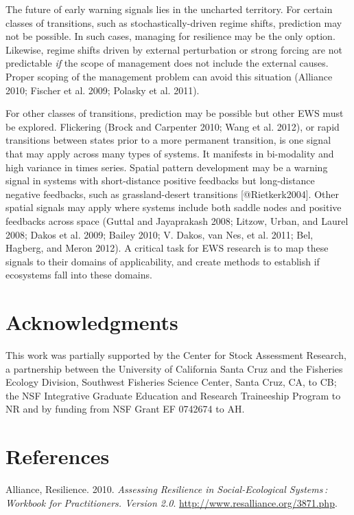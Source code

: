 \documentclass[author-year, review]{elsarticle} %
\begin{document}
The future of early warning signals lies in the uncharted territory. For
certain classes of transitions, such as stochastically-driven regime
shifts, prediction may not be possible. In such cases, managing for
resilience may be the only option. Likewise, regime shifts driven by
external perturbation or strong forcing are not predictable \emph{if}
the scope of management does not include the external causes. Proper
scoping of the management problem can avoid this situation (Alliance
2010; Fischer et al. 2009; Polasky et al. 2011).

For other classes of transitions, prediction may be possible but other
EWS must be explored. Flickering (Brock and Carpenter 2010; Wang et al.
2012), or rapid transitions between states prior to a more permanent
transition, is one signal that may apply across many types of systems.
It manifests in bi-modality and high variance in times series. Spatial
pattern development may be a warning signal in systems with
short-distance positive feedbacks but long-distance negative feedbacks,
such as grassland-desert transitions {[}@Rietkerk2004{]}. Other spatial
signals may apply where systems include both saddle nodes and positive
feedbacks across space (Guttal and Jayaprakash 2008; Litzow, Urban, and
Laurel 2008; Dakos et al. 2009; Bailey 2010; V. Dakos, van Nes, et al.
2011; Bel, Hagberg, and Meron 2012). A critical task for EWS research is
to map these signals to their domains of applicability, and create
methods to establish if ecosystems fall into these domains.

\section{Acknowledgments}

This work was partially supported by the Center for Stock Assessment
Research, a partnership between the University of California Santa Cruz
and the Fisheries Ecology Division, Southwest Fisheries Science Center,
Santa Cruz, CA, to CB; the NSF Integrative Graduate Education and
Research Traineeship Program to NR and by funding from NSF Grant EF
0742674 to AH.

\section{References}

Alliance, Resilience. 2010. \emph{Assessing Resilience in
Social-Ecological Systems : Workbook for Practitioners. Version 2.0}.
\url{http://www.resalliance.org/3871.php}.
\end{document}
